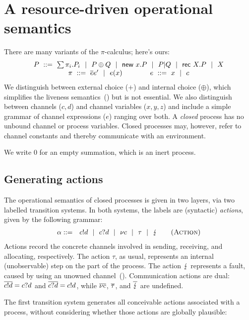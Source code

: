 \documentclass{entcs}
\begin{document}
\section{A resource-driven operational semantics}
\label{sec:operational}

There are many variants of the $\pi$-calculus; here's ours:
\[
\begin{array}{c}
  P \ ::=\ \sum \pi_i. P_i \ \ |\ \  P \oplus Q \ \ |\ \  \textsf{new } x. P \ \ |\ \  P|Q \ \ |\ \  \textsf{rec } X. P \ \ |\ \  X \\
  \pi \ ::=\ \overline{e}e' \ \ |\ \  e(x)  \qquad \qquad
  e \ ::=\ x \ \ |\ \  c 
\end{array}
\]
We distinguish between external choice ($+$) and internal choice
($\oplus$), which simplifies the liveness
semantics~() but is not essential.  We also
distinguish between channels ($c, d$) and channel variables ($x, y, z$) and
include a simple grammar of channel expressions ($e$) ranging over
both.  A \emph{closed} process has no unbound channel or process
variables.  Closed processes may, however, refer to channel constants
and thereby communicate with an environment.

We write $0$ for an empty summation, which is an inert process.

\subsection{Generating actions}

The operational semantics of closed processes is given in two layers,
via two labelled transition systems.  In both systems, the
labels are (syntactic) \emph{actions}, given by the following grammar:
\begin{eqnarray*}
  \alpha &::=& c!d \ \ |\ \  c?d \ \ |\ \  \nu c \ \ |\ \  \tau \ \ |\ \  \lightning \qquad (\textsc{Action})
\end{eqnarray*}
Actions record the concrete channels involved in sending, receiving,
and allocating, respectively.  The action $\tau$, as usual, represents
an internal (unobservable) step on the part of the process.  The
action $\lightning$ represents a fault, caused by using an unowned
channel~().  Communication actions are dual: $\overline{c!d} = c?d$ and
$\overline{c?d} = c!d$, while $\overline{\nu c}$, $\overline{\tau}$, and $\overline{\lightning}$
are undefined.

The first transition system generates all conceivable actions
associated with a process, without considering whether those actions
are globally plausible:
\end{document}
